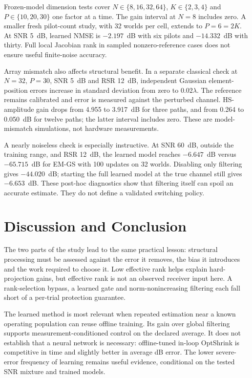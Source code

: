 \documentclass[10pt,journal,letterpaper]{IEEEtran}
\begin{document}
Frozen-model dimension tests cover $N\in\{8,16,32,64\}$, $K\in\{2,3,4\}$ and $P\in\{10,20,30\}$ one factor at a time. The gain interval at $N=8$ includes zero. A smaller fresh pilot-count study, with 32 worlds per cell, extends to $P=6=2K$. At SNR 5~dB, learned NMSE is $-2.197$~dB with six pilots and $-14.332$~dB with thirty. Full local Jacobian rank in sampled nonzero-reference cases does not ensure useful finite-noise accuracy.

Array mismatch also affects structural benefit. In a separate classical check at $N=32$, $P=30$, SNR 5~dB and RSR 12~dB, independent Gaussian element-position errors increase in standard deviation from zero to $0.02\lambda$. The reference remains calibrated and error is measured against the perturbed channel. HS-amplitude gain drops from 4.955 to 3.917~dB for three paths, and from 0.264 to 0.050~dB for twelve paths; the latter interval includes zero. These are model-mismatch simulations, not hardware measurements.

A nearly noiseless check is especially instructive. At SNR 60~dB, outside the training range, and RSR 12~dB, the learned model reaches $-6.647$~dB versus $-65.715$~dB for EM-GS with 100 updates on 32 worlds. Disabling only filtering gives $-44.020$~dB; starting the full learned model at the true channel still gives $-6.653$~dB. These post-hoc diagnostics show that filtering itself can spoil an accurate estimate. They do not define a validated switching policy.

\section{Discussion and Conclusion}
The two parts of the study lead to the same practical lesson: structural processing must be assessed against the error it removes, the bias it introduces and the work required to choose it. Low effective rank helps explain hard-projection gains, but effective rank is not an observed receiver input here. A rank-selection bypass, a learned gate and norm-nonincreasing filtering each fall short of a per-trial protection guarantee.

The learned method is most relevant when repeated estimation near a known operating population can reuse offline training. Its gain over global filtering supports measurement-conditioned control on the declared average. It does not establish that a neural network is necessary: offline-tuned in-loop OptShrink is competitive in time and slightly better in average dB error. The lower severe-error frequency of learning remains useful evidence, conditional on the tested SNR mixture and trained models.
\end{document}
